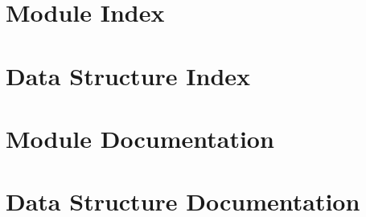 \let\mypdfximage\pdfximage\def\pdfximage{\immediate\mypdfximage}\documentclass[twoside]{book}
\newcommand{\+}{\discretionary{\mbox{\scriptsize$\hookleftarrow$}}{}{}}
\newcommand{\clearemptydoublepage}{%
  \newpage{\pagestyle{empty}\cleardoublepage}%
}
\begin{document}
\chapter{Module Index}

\chapter{Data Structure Index}

\chapter{Module Documentation}
















\chapter{Data Structure Documentation}


































\backmatter
\newpage
{}
\clearemptydoublepage
{}
\printindex
\end{document}
